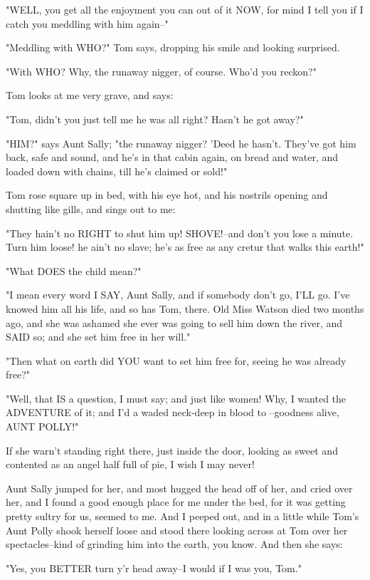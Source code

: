 "WELL, you get all the enjoyment you can out of it NOW, for mind I tell
you if I catch you meddling with him again--"

"Meddling with WHO?"  Tom says, dropping his smile and looking surprised.

"With WHO?  Why, the runaway nigger, of course.  Who'd you reckon?"

Tom looks at me very grave, and says:

"Tom, didn't you just tell me he was all right?  Hasn't he got away?"

"HIM?" says Aunt Sally; "the runaway nigger?  'Deed he hasn't.  They've
got him back, safe and sound, and he's in that cabin again, on bread and
water, and loaded down with chains, till he's claimed or sold!"

Tom rose square up in bed, with his eye hot, and his nostrils opening and
shutting like gills, and sings out to me:

"They hain't no RIGHT to shut him up!  SHOVE!--and don't you lose a
minute.  Turn him loose! he ain't no slave; he's as free as any cretur
that walks this earth!"

"What DOES the child mean?"

"I mean every word I SAY, Aunt Sally, and if somebody don't go, I'LL go.
I've knowed him all his life, and so has Tom, there.  Old Miss Watson
died two months ago, and she was ashamed she ever was going to sell him
down the river, and SAID so; and she set him free in her will."

"Then what on earth did YOU want to set him free for, seeing he was
already free?"

"Well, that IS a question, I must say; and just like women!  Why, I
wanted the ADVENTURE of it; and I'd a waded neck-deep in blood to
--goodness alive, AUNT POLLY!"

If she warn't standing right there, just inside the door, looking as
sweet and contented as an angel half full of pie, I wish I may never!

Aunt Sally jumped for her, and most hugged the head off of her, and cried
over her, and I found a good enough place for me under the bed, for it
was getting pretty sultry for us, seemed to me.  And I peeped out, and in
a little while Tom's Aunt Polly shook herself loose and stood there
looking across at Tom over her spectacles--kind of grinding him into the
earth, you know.  And then she says:

"Yes, you BETTER turn y'r head away--I would if I was you, Tom."


